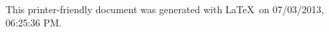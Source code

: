 \documentclass[11 pt,oneside,letterpaper]{article}
\begin{document}
  \thispagestyle{empty}
  \hspace*{\fill} \\
  \begin{center} \begin{small}
  This printer-friendly document was generated with \LaTeX \  on 07/03/2013, 06:25:36 PM.
  \end{small} \end{center}
  
\end{document}
